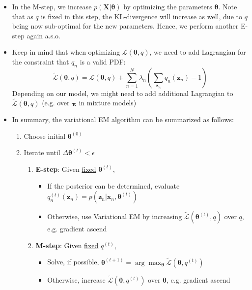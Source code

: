 \begin{itemize}
	\item In the M-step, we increase $p(\bm{X}|\bm{\theta})$ by optimizing the parameters $\bm{\theta}$. Note that as $q$ is fixed in this step, the KL-divergence will increase as well, due to $q$ being now sub-optimal for the new parameters. Hence, we perform another E-step again a.s.o.
	\item Keep in mind that when optimizing $\mathcal{L}(\bm{\theta}, q)$, we need to add Lagrangian for the constraint that $q_n$ is a valid PDF:
	$$\tilde{\mathcal{L}}(\bm{\theta}, q) = \mathcal{L}(\bm{\theta}, q) + \sum_{n=1}^{N} \lambda_n \left(\sum_{\bm{z}_n} q_n(\bm{z}_n) - 1\right)$$
	Depending on our model, we might need to add additional Lagrangian to $\tilde{\mathcal{L}}(\bm{\theta}, q)$ (e.g. over $\bm{\pi}$ in mixture models)
	\item In summary, the variational EM algorithm can be summarized as follows:
	
	\begin{tcolorbox}[colback=white!85!gray,colframe=gray!75!black,title=Variational EM algorithm]
		\begin{enumerate}
			\item Choose initial $\bm{\theta}^{(0)}$
			\item Iterate until $\Delta \bm{\theta}^{(t)} < \epsilon$
			\begin{enumerate}
				\item \textbf{E-step}: Given \underline{fixed} $\bm{\theta}^{(t)}$,
				\begin{itemize}
					\item If the posterior can be determined, evaluate $q_n^{(t)}(\bm{z}_n) = p(\bm{z}_n|\bm{x}_n, \bm{\theta}^{(t)})$
					\item Otherwise, use Variational EM by increasing $\tilde{\mathcal{L}}(\bm{\theta}^{(t)}, q)$ over $q$, e.g. gradient ascend
				\end{itemize}
				\item \textbf{M-step}: Given \underline{fixed} $q^{(t)}$,
				\begin{itemize}
					\item Solve, if possible, $\bm{\theta}^{(t+1)} = \arg\max_{\bm{\theta}} \tilde{\mathcal{L}}(\bm{\theta}, q^{(t)})$ %
					\item Otherwise, increase $\tilde{\mathcal{L}}(\bm{\theta}, q^{(t)})$ over $\bm{\theta}$, e.g. gradient ascend
				\end{itemize}
			\end{enumerate}
		\end{enumerate}
	\end{tcolorbox}
\end{itemize}
